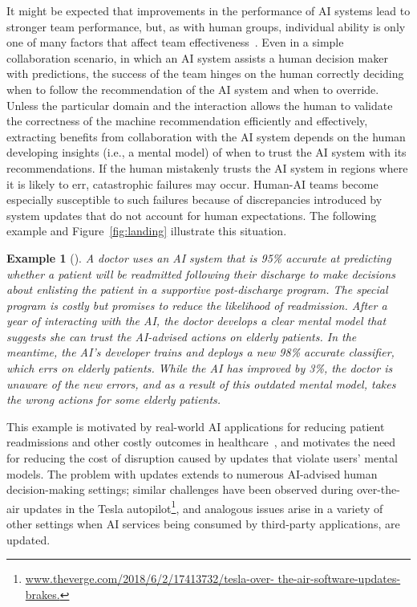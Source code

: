 \documentclass[letterpaper]{article}
\newtheorem*{example}{Example}
\begin{document}
It might be expected that improvements in the performance of AI systems lead to stronger team performance, but, as with human groups, individual ability is only one of many factors that affect team effectiveness~\cite{dechurch-jap10,grosz1996collaborative}. Even in a simple collaboration scenario, in which an AI system assists a human decision maker with predictions, the success of the team hinges on the human correctly deciding when to follow the recommendation of the AI system and when to override. Unless the particular domain and the interaction allows the human to validate the correctness of the machine recommendation efficiently and effectively, extracting benefits from collaboration with the AI system depends on the human developing insights (i.e., a mental model) of when to trust the AI system with its recommendations. If the human mistakenly trusts the AI system in regions where it is likely to err, catastrophic failures may occur. 
Human-AI teams become especially susceptible to such failures because of discrepancies introduced by system updates that do not account for human expectations. The following example and Figure~\ref{fig:landing} illustrate this situation.


\begin{example}[]
A doctor uses an AI system that is 95\% accurate at predicting whether a patient will be readmitted following their discharge to make decisions about enlisting the patient in a supportive post-discharge program. The special program is costly but promises to reduce the likelihood of readmission. After a year of interacting with the AI, the doctor develops a clear mental model that suggests she can trust the AI-advised actions on elderly patients. In the meantime, the AI's developer trains and deploys a new 98\% accurate classifier, which errs on elderly patients. 
While the AI has improved by 3\%, the doctor is unaware of the new errors, and as a result of this outdated mental model, takes the wrong actions for some elderly patients.
\end{example}

This example is motivated by real-world AI applications for reducing patient readmissions and other costly outcomes in healthcare~\cite{bayati2014data,wiens2016patient,caruana2015intelligible}, and motivates the need for reducing the cost of disruption caused by updates that violate  %
users' mental models. The problem with updates extends to numerous AI-advised human decision-making settings; similar challenges have been observed during over-the-air updates in the Tesla autopilot\footnote{\url{www.theverge.com/2018/6/2/17413732/tesla-over- the-air-software-updates-brakes.}}, and  analogous issues arise in a variety of other settings when AI services 
being consumed by third-party applications, are updated.
\end{document}
